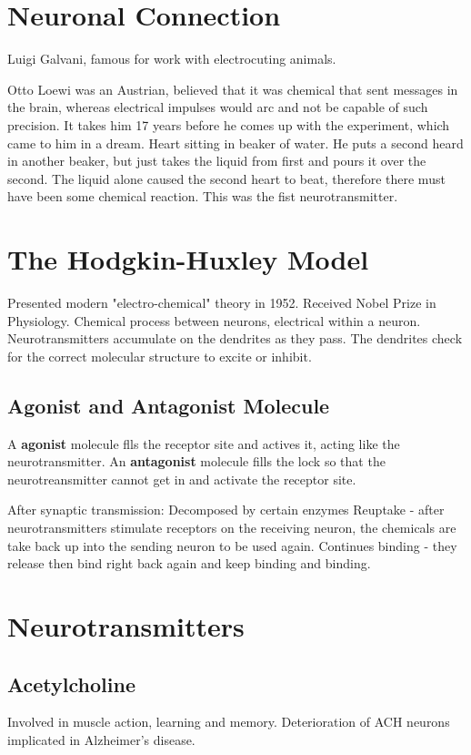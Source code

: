 \section*{Neuronal Connection}
Luigi Galvani, famous for work with electrocuting animals. 

Otto Loewi was an Austrian, believed that it was chemical that sent messages in the brain, whereas electrical impulses would arc and not be capable of such precision. It takes him 17 years before he comes up with the experiment, which came to him in a dream. Heart sitting in beaker of water. He puts a second heard in another beaker, but just takes the liquid from first and pours it over the second. The liquid alone caused the second heart to beat, therefore there must have been some chemical reaction. This was the fist neurotransmitter.

\section*{The Hodgkin-Huxley Model}
Presented modern "electro-chemical" theory in 1952. Received Nobel Prize in Physiology. Chemical process between neurons, electrical within a neuron. Neurotransmitters accumulate on the dendrites as they pass. The dendrites check for the correct molecular structure to excite or inhibit. 

\subsection*{Agonist and Antagonist Molecule}
A \textbf{agonist} molecule flls the receptor site and actives it, acting like the neurotransmitter. 
An \textbf{antagonist} molecule fills the lock so that the neurotreansmitter cannot get in and activate the receptor site. 

After synaptic transmission:
Decomposed by certain enzymes
Reuptake - after neurotransmitters stimulate receptors on the receiving neuron, the chemicals are take back up into the sending neuron to be used again.
Continues binding - they release then bind right back again and keep binding and binding.

\section*{Neurotransmitters}
\subsection*{Acetylcholine}
Involved in muscle action, learning and memory. Deterioration of ACH neurons implicated in Alzheimer's disease. 

